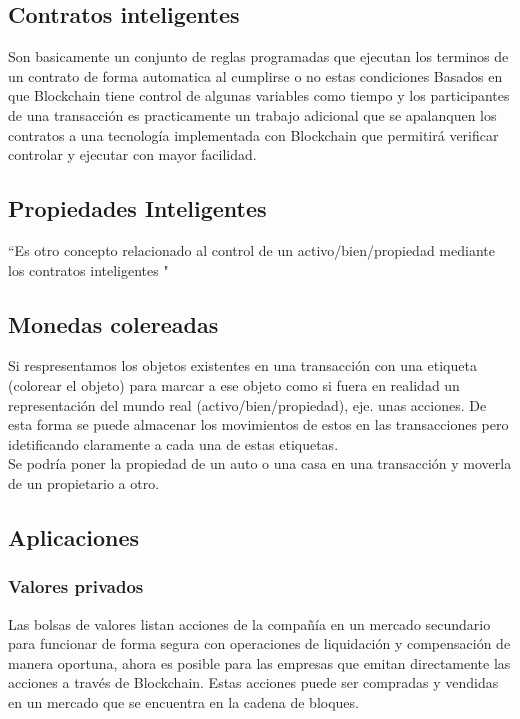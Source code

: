 \subsection{Contratos inteligentes}
Son basicamente un conjunto de reglas programadas que ejecutan los terminos de un contrato de forma automatica al cumplirse o no estas condiciones \citep{crosby2016blockchain}
Basados en que Blockchain  tiene control de algunas variables como tiempo \citep{kosba2016hawk} y los participantes de una transacción es practicamente un trabajo adicional que se apalanquen los contratos a una tecnología implementada con Blockchain que permitirá verificar controlar y ejecutar con mayor facilidad.

\subsection{Propiedades Inteligentes}
``Es otro concepto relacionado al control de un activo/bien/propiedad mediante los contratos inteligentes "
\citep{crosby2016blockchain}

\subsection{Monedas colereadas}
Si respresentamos los objetos existentes en una transacción con una etiqueta (colorear el objeto) para marcar a ese objeto como si fuera en realidad un representación del mundo real (activo/bien/propiedad), eje. unas acciones.
De esta forma se puede almacenar los movimientos de estos en las transacciones pero idetificando claramente a cada una de estas etiquetas.
\\
Se podría poner la propiedad de un auto o una casa en una transacción y moverla de un propietario a otro. \citep{crosby2016blockchain}



\subsection{Aplicaciones}

\subsubsection{Valores privados}
Las bolsas de valores listan acciones de la compañía en un mercado secundario para funcionar de forma segura con operaciones de liquidación y compensación de manera oportuna, ahora es posible para las empresas que emitan directamente las acciones a través de Blockchain. Estas acciones puede ser compradas y vendidas en un mercado que se encuentra en la cadena de bloques. \citep{crosby2016blockchain}

